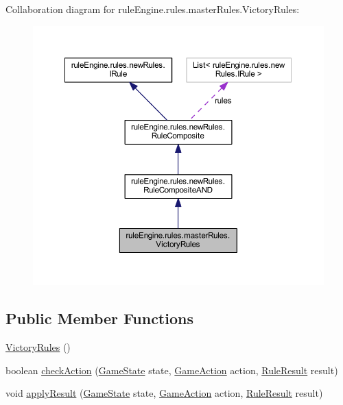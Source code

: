 Collaboration diagram for rule\+Engine.\+rules.\+master\+Rules.\+Victory\+Rules\+:
\nopagebreak
\begin{figure}[H]
\begin{center}
\leavevmode
\includegraphics[width=350pt]{classrule_engine_1_1rules_1_1master_rules_1_1_victory_rules__coll__graph}
\end{center}
\end{figure}
\subsection*{Public Member Functions}
\begin{DoxyCompactItemize}
\item 
\mbox{\hyperlink{classrule_engine_1_1rules_1_1master_rules_1_1_victory_rules_a586a33bc8e22dcf30843070346ec7425}{Victory\+Rules}} ()
\item 
boolean \mbox{\hyperlink{classrule_engine_1_1rules_1_1master_rules_1_1_victory_rules_a9f52825deabf9b02fe2b879be5064ae7}{check\+Action}} (\mbox{\hyperlink{classgame_1_1game_state_1_1_game_state}{Game\+State}} state, \mbox{\hyperlink{classrule_engine_1_1_game_action}{Game\+Action}} action, \mbox{\hyperlink{classrule_engine_1_1_rule_result}{Rule\+Result}} result)
\item 
void \mbox{\hyperlink{classrule_engine_1_1rules_1_1master_rules_1_1_victory_rules_a93ffec6d57021369a8f6ab2f493d97d2}{apply\+Result}} (\mbox{\hyperlink{classgame_1_1game_state_1_1_game_state}{Game\+State}} state, \mbox{\hyperlink{classrule_engine_1_1_game_action}{Game\+Action}} action, \mbox{\hyperlink{classrule_engine_1_1_rule_result}{Rule\+Result}} result)
\end{DoxyCompactItemize}
